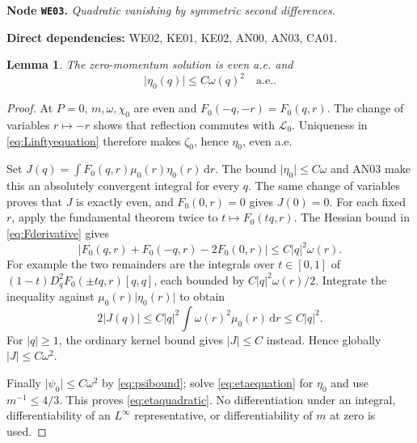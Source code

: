 \documentclass[11pt,a4paper]{article}
\newtheorem{lemma}[theorem]{Lemma}
\theoremstyle{remark}\newtheorem{remark}[theorem]{Remark}
\newcommand{\abs}[1]{\lvert #1\rvert}\newcommand{\rankone}[2]{\lvert #1\rangle\langle #2\rvert}
\newcommand{\dd}{\,\mathrm d}\newcommand{\almosteverywhere}{\text{a.e.}}
\newcommand{\node}[3]{\par\Needspace{6\baselineskip}\smallskip\hypertarget{node:#1}{}\label{nodepage:#1}\noindent\textbf{Node \texttt{#1}.} \textit{#2.}\par\noindent\textbf{Direct dependencies:} #3.\par}
\begin{document}
\node{WE03}{Quadratic vanishing by symmetric second differences}{WE02, KE01, KE02, AN00, AN03, CA01}
\begin{lemma}\label{lem:etaquadratic}
The zero-momentum solution is even a.e. and
\begin{equation}
 \abs{\eta_0(q)}\leq C\omega(q)^2\quad\almosteverywhere.\label{eq:etaquadratic}
\end{equation}
\end{lemma}
\begin{proof}
At $P=0$, $m,\omega,\chi_0$ are even and $F_0(-q,-r)=F_0(q,r)$. The change of variables $r\mapsto-r$ shows that reflection commutes with $\mathscr L_0$. Uniqueness in \eqref{eq:Linftyequation} therefore makes $\zeta_0$, hence $\eta_0$, even a.e.

Set $J(q)=\int F_0(q,r)\mu_0(r)\eta_0(r)\dd r$. The bound $\abs{\eta_0}\leq C\omega$ and AN03 make this an absolutely convergent integral for every $q$. The same change of variables proves that $J$ is exactly even, and $F_0(0,r)=0$ gives $J(0)=0$. For each fixed $r$, apply the fundamental theorem twice to $t\mapsto F_0(tq,r)$. The Hessian bound in \eqref{eq:Fderivative} gives
\[
 \abs{F_0(q,r)+F_0(-q,r)-2F_0(0,r)}
       \leq C\abs q^2\omega(r).
\]
For example the two remainders are the integrals over $t\in[0,1]$ of $(1-t)D_q^2F_0(\pm tq,r)[q,q]$, each bounded by $C\abs q^2\omega(r)/2$. Integrate the inequality against $\mu_0(r)\abs{\eta_0(r)}$ to obtain
\[
 2\abs{J(q)}\leq C\abs q^2\int\omega(r)^2\mu_0(r)\dd r
       \leq C\abs q^2.
\]
For $\abs q\geq1$, the ordinary kernel bound gives $\abs J\leq C$ instead. Hence globally $\abs J\leq C\omega^2$.

Finally $\abs{\psi_0}\leq C\omega^2$ by \eqref{eq:psibound}; solve \eqref{eq:etaequation} for $\eta_0$ and use $m^{-1}\leq4/3$. This proves \eqref{eq:etaquadratic}. No differentiation under an integral, differentiability of an $L^\infty$ representative, or differentiability of $m$ at zero is used.
\end{proof}
\end{document}
